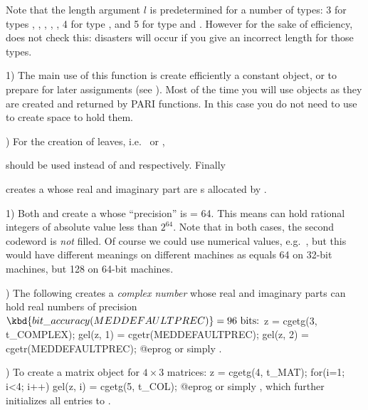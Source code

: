 Note that the length argument $l$ is predetermined for a number of types:
3 for types , , , ,
, 4 for type , and 5 for type  and .
However for the sake of efficiency,  does not check this: disasters
will occur if you give an incorrect length for those types.

 1)  The main use of this function is create efficiently
a constant object, or to prepare for later assignments (see
). Most of the time you will use  objects as they
are created and returned by PARI functions. In this case you do not need to
use  to create space to hold them.

) For the creation of leaves, i.e.~ or ,



\noindent should be used instead of  and
 respectively. Finally


\noindent creates a  whose real and imaginary part are
s allocated by .

 1) Both  and
 create a  whose ``precision'' is
 = 64. This means  can hold rational
integers of absolute value less than $2^{64}$. Note that in both cases, the
second codeword is \emph{not} filled. Of course we could use numerical
values, e.g.~, but this would have different meanings on
different machines as  equals 64 on 32-bit machines,
but 128 on 64-bit machines.

) The following creates a \emph{complex number} whose real and
imaginary parts can hold real numbers of precision
$\kbd{bit\_accuracy(MEDDEFAULTPREC)} = 96\hbox{ bits:}$
%
\bprog
  z = cgetg(3, t_COMPLEX);
  gel(z, 1) = cgetr(MEDDEFAULTPREC);
  gel(z, 2) = cgetr(MEDDEFAULTPREC);
@eprog\noindent
or simply .

) To create a matrix object for $4\times 3$ matrices:
%
\bprog
  z = cgetg(4, t_MAT);
  for(i=1; i<4; i++) gel(z, i) = cgetg(5, t_COL);
@eprog\noindent
or simply , which further initializes all entries
to .

